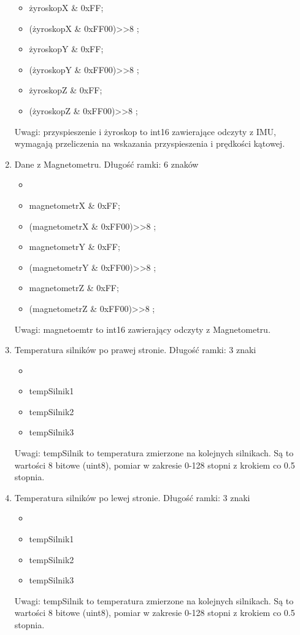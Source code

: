\documentclass{article}
\begin{document}
\begin{enumerate}
\begin{itemize}
  		\item żyroskopX \& 0xFF;
  		\item (żyroskopX \& 0xFF00)>>8 ;
  		\item żyroskopY \& 0xFF;
  		\item (żyroskopY \& 0xFF00)>>8 ;
  		\item żyroskopZ \& 0xFF;
  		\item (żyroskopZ \& 0xFF00)>>8 ;	
  		\end{itemize}
  		Uwagi: przyspieszenie i żyroskop to int16 zawierające odczyty z IMU, wymagają przeliczenia na wskazania przyspieszenia i prędkości kątowej.
  	\item Dane z Magnetometru. Długość ramki: 6 znaków
  		\begin{itemize}
  		\item {}
  		\item magnetometrX \& 0xFF;
  		\item (magnetometrX \& 0xFF00)>>8 ;
  		\item magnetometrY \& 0xFF;
  		\item (magnetometrY \& 0xFF00)>>8 ;
  		\item magnetometrZ \& 0xFF;
  		\item (magnetometrZ \& 0xFF00)>>8 ;
  		\end{itemize}
  		Uwagi: magnetoemtr to int16 zawierający odczyty z Magnetometru.
  	\item Temperatura silników po prawej stronie. Długość ramki: 3 znaki
  		\begin{itemize}
  		\item {}
  		\item tempSilnik1
  		\item tempSilnik2
  		\item tempSilnik3
		\end{itemize}  		
	Uwagi: tempSilnik to temperatura zmierzone na kolejnych silnikach. Są to wartości 8 bitowe (uint8), pomiar w zakresie 0-128 stopni z krokiem co 0.5 stopnia.  
	\item Temperatura silników po lewej stronie. Długość ramki: 3 znaki
  		\begin{itemize}
  		\item {}
  		\item tempSilnik1
  		\item tempSilnik2
  		\item tempSilnik3
		\end{itemize}  		
	Uwagi: tempSilnik to temperatura zmierzone na kolejnych silnikach. Są to wartości 8 bitowe (uint8), pomiar w zakresie 0-128 stopni z krokiem co 0.5 stopnia.  

\end{enumerate}
\end{document}
